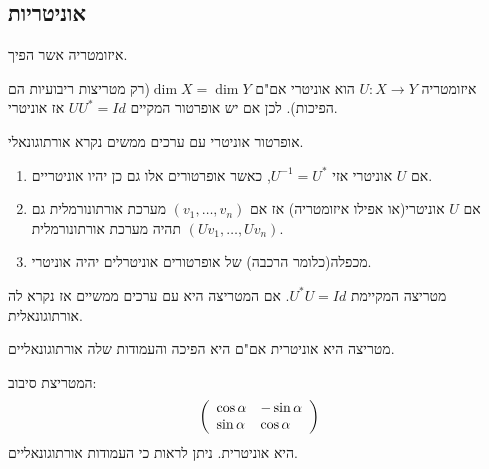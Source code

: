 \documentclass{tstextbook}
\begin{document}
\subsection{אוניטריות}

\begin{definition}
איזומטריה אשר הפיך.

\end{definition}
\begin{corollary}
איזומטריה \(U:X\to Y\) הוא אוניטרי אם"ם \(\dim X=\dim Y\)(רק מטריצות ריבועיות הם הפיכות). לכן אם יש אופרטור המקיים \(U U^{*}=Id\) אז אוניטרי.

\end{corollary}
\begin{definition}
אופרטור אוניטרי עם ערכים ממשים נקרא אורתוגונאלי.

\end{definition}
\begin{proposition}
  \begin{enumerate}
    \item אם \(U\) אוניטרי אזי \(U^{-1}=U^{*}\), כאשר אופרטורים אלו גם כן יהיו אוניטריים. 


    \item אם \(U\) אוניטרי(או אפילו איזומטריה) אז אם \(\left( v_{1},\dots,v_{n} \right)\) מערכת אורתונורמלית גם \(\left( Uv_{1},\dots,Uv_{n}  \right)\) תהיה מערכת אורתונורמלית. 


    \item מכפלה(כלומר הרכבה) של אופרטורים אוניטרלים יהיה אוניטרי. 


  \end{enumerate}
\end{proposition}
\begin{definition}
מטריצה המקיימת \(U^{*}U=Id\). אם המטריצה היא עם ערכים ממשיים אז נקרא לה אורתוגונאלית.

\end{definition}
\begin{corollary}
מטריצה היא אוניטרית אם"ם היא הפיכה והעמודות שלה אורתוגונאליים.

\end{corollary}
\begin{example}
המטריצת סיבוב:
$$\left(\begin{array}{l l}{{\cos\alpha}}&{{-\sin\alpha}}\\ {{\sin\alpha}}&{{\cos\alpha}}\end{array}\right)$$
היא אוניטרית. ניתן לראות כי העמודות אורתוגונאליים.

\end{example}
\end{document}
